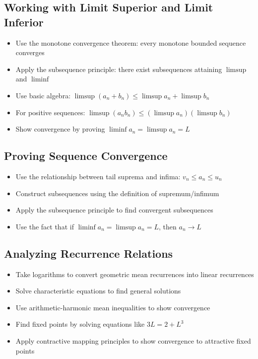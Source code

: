 \subsection*{Working with Limit Superior and Limit Inferior}
\begin{itemize}
\item Use the monotone convergence theorem: every monotone bounded sequence converges
\item Apply the subsequence principle: there exist subsequences attaining $\limsup$ and $\liminf$
\item Use basic algebra: $\limsup(a_n+b_n) \le \limsup a_n + \limsup b_n$
\item For positive sequences: $\limsup(a_n b_n) \le (\limsup a_n)(\limsup b_n)$
\item Show convergence by proving $\liminf a_n = \limsup a_n = L$
\end{itemize}

\subsection*{Proving Sequence Convergence}
\begin{itemize}
\item Use the relationship between tail suprema and infima: $v_n \le a_n \le u_n$
\item Construct subsequences using the definition of supremum/infimum
\item Apply the subsequence principle to find convergent subsequences
\item Use the fact that if $\liminf a_n = \limsup a_n = L$, then $a_n \to L$
\end{itemize}

\subsection*{Analyzing Recurrence Relations}
\begin{itemize}
\item Take logarithms to convert geometric mean recurrences into linear recurrences
\item Solve characteristic equations to find general solutions
\item Use arithmetic-harmonic mean inequalities to show convergence
\item Find fixed points by solving equations like $3L = 2 + L^3$
\item Apply contractive mapping principles to show convergence to attractive fixed points
\end{itemize}

